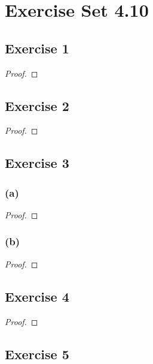 \documentclass[14pt]{extarticle}
\begin{document}
\section{Exercise Set 4.10}

\subsection{Exercise 1}

\begin{proof}

\end{proof}

\subsection{Exercise 2}

\begin{proof}

\end{proof}

\subsection{Exercise 3}

\subsubsection{(a)}

\begin{proof}

\end{proof}

\subsubsection{(b)}

\begin{proof}

\end{proof}

\subsection{Exercise 4}

\begin{proof}

\end{proof}

\subsection{Exercise 5}
\end{document}
